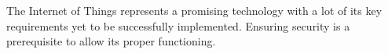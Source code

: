 \documentclass[14]{article}
\begin{document}
The Internet of Things represents a promising technology with a lot of its key requirements yet to be successfully implemented\cite{borgia2014internet}. Ensuring security is a prerequisite to allow its proper functioning. 

%

	
\end{document}
